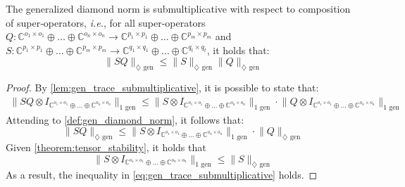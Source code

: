 \begin{proposition}\label{lem:gen_diamond_submultiplicative}
  The generalized diamond norm is submultiplicative with respect to composition of super‑operators, \textit{i.e.}, for all super-operators $Q: \mathbb{C}^{o_1 \times o_1} \oplus \ldots \oplus \mathbb{C}^{o_n \times o_n}  \rightarrow \mathbb{C}^{p_1 \times p_1} \oplus \ldots \oplus  \mathbb{C}^{p_m \times p_m}$ and $S: \mathbb{C}^{p_1 \times p_1} \oplus \ldots \oplus \mathbb{C}^{p_m \times p_m}  \rightarrow \mathbb{C}^{q_1 \times q_1} \oplus \ldots \oplus \mathbb{C}^{q_t \times q_t}$, it holds that:
  \begin{equation} \label{eq:gen_trace_submultiplicative}
    \lVert S  Q \rVert_{\diamondsuit \text{ gen}} \leq \lVert S \rVert_{\diamondsuit  \text{ gen}} \lVert Q \rVert_{\diamondsuit  \text{ gen}}
  \end{equation}
\end{proposition}

\begin{proof}
 
  By \autoref{lem:gen_trace_submultiplicative}, it is possible to state that:
\begin{equation}
  \begin{split}
   \lVert S Q \otimes I_{\mathbb{C}^{o_1 \times o_1} \oplus \ldots \oplus \mathbb{C}^{o_n \times o_n}} \rVert_{1\text{ gen}} \leq \lVert S \otimes I_{\mathbb{C}^{o_1 \times o_1} \oplus \ldots \oplus \mathbb{C}^{o_n \times o_n}} \rVert_{1\text{ gen}} \cdot \lVert Q \otimes I_{\mathbb{C}^{o_1 \times o_1} \oplus \ldots \oplus \mathbb{C}^{o_n \times o_n}} \rVert_{1\text{ gen}}  
    \end{split}
\end{equation}
Attending to \autoref{def:gen_diamond_norm}, it follows that:
\begin{equation}
   \lVert S Q \rVert_{\diamondsuit \text{ gen}} \leq  \lVert S \otimes I_{\mathbb{C}^{o_1 \times o_1} \oplus \ldots \oplus \mathbb{C}^{o_n \times o_n}} \rVert_{1\text{ gen}} \cdot \lVert Q \rVert_{\diamondsuit \text{ gen}}
\end{equation}
Given \autoref{theorem:tensor_stability}, it holds that
\begin{equation}
  \lVert S \otimes I_{\mathbb{C}^{o_1 \times o_1} \oplus \ldots \oplus \mathbb{C}^{o_n \times o_n}} \rVert_{1\text{ gen}} \leq \lVert S \rVert_{\diamondsuit \text{ gen}}
\end{equation}
As a result, the inequality in \autoref{eq:gen_trace_submultiplicative} holds.
\end{proof}


